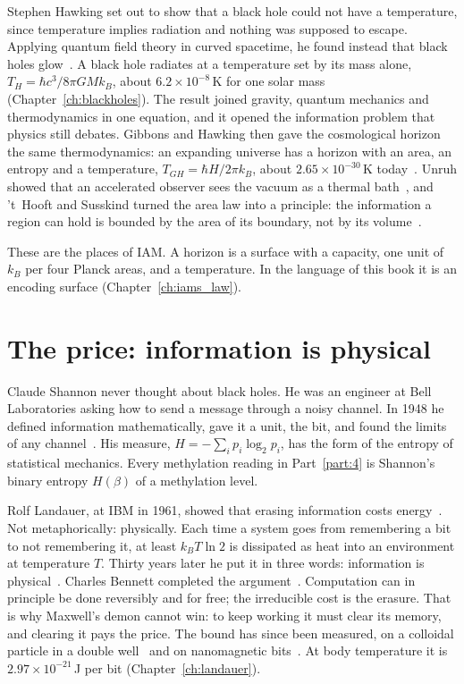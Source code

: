 Stephen Hawking set out to show that a black hole could not have a temperature, since temperature implies radiation and nothing was supposed
to escape. Applying quantum field theory in curved spacetime, he found instead that black holes glow~\cite{Hawking1974,Hawking1975}. A black
hole radiates at a temperature set by its mass alone, $T_H=\hbar c^3/8\pi GMk_B$, about $6.2\times10^{-8}$\,K for one solar mass
(Chapter~\ref{ch:blackholes}). \derived{} The result joined gravity, quantum mechanics and thermodynamics in one equation, and it opened the
information problem that physics still debates. Gibbons and Hawking then gave the cosmological horizon the same thermodynamics: an
expanding universe has a horizon with an area, an entropy and a temperature, $T_{GH}=\hbar H/2\pi k_B$, about $2.65\times10^{-30}$\,K
today~\cite{GibbonsHawking1977}. \derived{} Unruh showed that an accelerated observer sees the vacuum as a thermal bath~\cite{Unruh1976},
and 't~Hooft and Susskind turned the area law into a principle: the information a region can hold is bounded by the area of its boundary,
not by its volume~\cite{tHooft1993,Susskind1995}.

These are the places of IAM. A horizon is a surface with a capacity, one unit of $k_B$ per four Planck areas, and a temperature. In the
language of this book it is an encoding surface (Chapter~\ref{ch:iams_law}).

\section*{The price: information is physical}

Claude Shannon never thought about black holes. He was an engineer at Bell Laboratories asking how to send a message through a noisy channel.
In 1948 he defined information mathematically, gave it a unit, the bit, and found the limits of any channel~\cite{Shannon1948}. His measure,
$H=-\sum_ip_i\log_2p_i$, has the form of the entropy of statistical mechanics. Every methylation reading in Part~\ref{part:4} is Shannon's
binary entropy $H(\beta)$ of a methylation level.

Rolf Landauer, at IBM in 1961, showed that erasing information costs energy~\cite{Landauer1961}. Not metaphorically: physically. Each time a
system goes from remembering a bit to not remembering it, at least $k_BT\ln2$ is dissipated as heat into an environment at temperature $T$.
\derived{} Thirty years later he put it in three words: information is physical~\cite{Landauer1991}. Charles Bennett completed the
argument~\cite{Bennett1982}. Computation can in principle be done reversibly and for free; the irreducible cost is the erasure. That is why
Maxwell's demon cannot win: to keep working it must clear its memory, and clearing it pays the price. The bound has since been measured, on a
colloidal particle in a double well~\cite{Berut2012} and on nanomagnetic bits~\cite{Hong2016}. \observed{} At body temperature it is
$2.97\times10^{-21}$\,J per bit (Chapter~\ref{ch:landauer}). \calc

